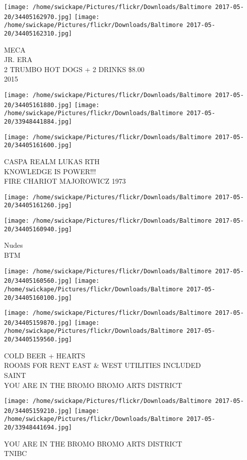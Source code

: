 \documentclass[10pt,letterpaper]{article}
\begin{document}
\texttt{[image: /home/swickape/Pictures/flickr/Downloads/Baltimore 2017-05-20/34405162970.jpg]}
\texttt{[image: /home/swickape/Pictures/flickr/Downloads/Baltimore 2017-05-20/34405162310.jpg]}

MECA\\
JR. ERA\\
2 TRUMBO HOT DOGS + 2 DRINKS \$8.00\\
2015
\pagebreak

\texttt{[image: /home/swickape/Pictures/flickr/Downloads/Baltimore 2017-05-20/34405161880.jpg]}
\texttt{[image: /home/swickape/Pictures/flickr/Downloads/Baltimore 2017-05-20/33948441884.jpg]}

\vspace{0.25in}
\texttt{[image: /home/swickape/Pictures/flickr/Downloads/Baltimore 2017-05-20/34405161600.jpg]}

CASPA REALM LUKAS RTH\\
KNOWLEDGE IS POWER!!!\\
FIRE CHARIOT MAJOROWICZ 1973
\pagebreak

\texttt{[image: /home/swickape/Pictures/flickr/Downloads/Baltimore 2017-05-20/34405161260.jpg]}

\vspace{0.25in}
\texttt{[image: /home/swickape/Pictures/flickr/Downloads/Baltimore 2017-05-20/34405160940.jpg]}

Nudes\\
BTM
\pagebreak

\texttt{[image: /home/swickape/Pictures/flickr/Downloads/Baltimore 2017-05-20/34405160560.jpg]}
\texttt{[image: /home/swickape/Pictures/flickr/Downloads/Baltimore 2017-05-20/34405160100.jpg]}

\texttt{[image: /home/swickape/Pictures/flickr/Downloads/Baltimore 2017-05-20/34405159870.jpg]}
\texttt{[image: /home/swickape/Pictures/flickr/Downloads/Baltimore 2017-05-20/34405159560.jpg]}

COLD BEER + HEARTS\\
ROOMS FOR RENT EAST \& WEST UTILITIES INCLUDED\\
SAINT\\
YOU ARE IN THE BROMO BROMO ARTS DISTRICT
\pagebreak

\texttt{[image: /home/swickape/Pictures/flickr/Downloads/Baltimore 2017-05-20/34405159210.jpg]}
\texttt{[image: /home/swickape/Pictures/flickr/Downloads/Baltimore 2017-05-20/33948441694.jpg]}

YOU ARE IN THE BROMO BROMO ARTS DISTRICT\\
TNIBC
\pagebreak
\end{document}
